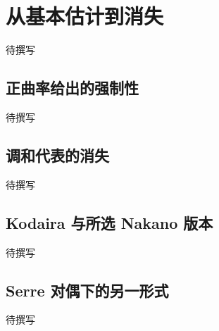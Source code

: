 
% 
% 

\section{从基本估计到消失}
\label{g4:sec:1803}

待撰写

\subsection{正曲率给出的强制性}
\label{g4:subsec:1803:01}
待撰写

\subsection{调和代表的消失}
\label{g4:subsec:1803:02}
待撰写

\subsection{Kodaira 与所选 Nakano 版本}
\label{g4:subsec:1803:03}
待撰写

\subsection{Serre 对偶下的另一形式}
\label{g4:subsec:1803:04}
待撰写
